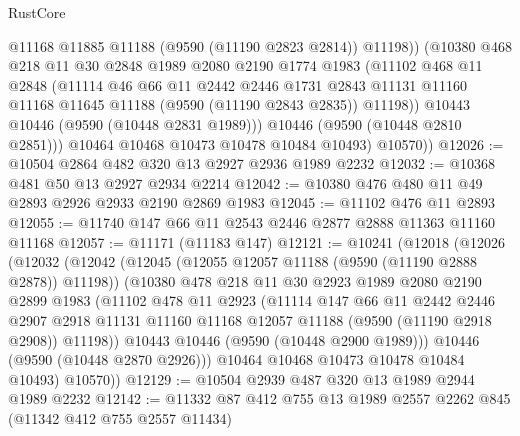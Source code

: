 \begin{lexlean}{RustCore}
\begin{coremodule}
                @11168
                @11885
                @11188
                (@9590 (@11190 @2823 @2814))
                @11198))
            (@10380
              @468
              @218
              @11
              @30
              @2848
              @1989
              @2080
              @2190
              @1774
              @1983
              (@11102
                @468
                @11
                @2848
                (@11114
                  @46
                  @66
                  @11
                  @2442
                  @2446
                  @1731
                  @2843
                  @11131
                  @11160
                  @11168
                  @11645
                  @11188
                  (@9590 (@11190 @2843 @2835))
                  @11198))
              @10443
              @10446
              (@9590 (@10448 @2831 @1989)))
            @10446
            (@9590 (@10448 @2810 @2851)))
          @10464
          @10468
          @10473
          @10478
          @10484
          @10493)
        @10570))
@12026 := @10504 @2864 @482 @320 @13 @2927 @2936 @1989 @2232
@12032 := @10368 @481 @50 @13 @2927 @2934 @2214
@12042 := @10380 @476 @480 @11 @49 @2893 @2926 @2933 @2190 @2869 @1983
@12045 := @11102 @476 @11 @2893
@12055 := @11740 @147 @66 @11 @2543 @2446 @2877 @2888 @11363 @11160 @11168
@12057 := @11171 (@11183 @147)
@12121 := @10241
    (@12018
      (@12026
        (@12032
          (@12042
            (@12045 (@12055 @12057 @11188 (@9590 (@11190 @2888 @2878)) @11198))
            (@10380
              @478
              @218
              @11
              @30
              @2923
              @1989
              @2080
              @2190
              @2899
              @1983
              (@11102
                @478
                @11
                @2923
                (@11114
                  @147
                  @66
                  @11
                  @2442
                  @2446
                  @2907
                  @2918
                  @11131
                  @11160
                  @11168
                  @12057
                  @11188
                  (@9590 (@11190 @2918 @2908))
                  @11198))
              @10443
              @10446
              (@9590 (@10448 @2900 @1989)))
            @10446
            (@9590 (@10448 @2870 @2926)))
          @10464
          @10468
          @10473
          @10478
          @10484
          @10493)
        @10570))
@12129 := @10504 @2939 @487 @320 @13 @1989 @2944 @1989 @2232
@12142 := @11332 @87 @412 @755 @13 @1989 @2557 @2262 @845 (@11342 @412 @755 @2557 @11434)

\end{coremodule}
\end{lexlean}
